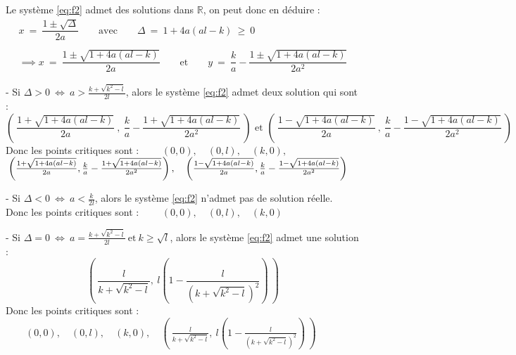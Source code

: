 \documentclass{article}
\begin{document}
Le système \eqref{eq:f2} admet des solutions dans $\mathbb{R}$, on peut donc en déduire :
\begin{equation*}
\begin{array}{cc}
    x\ =\ \dfrac{1 \pm \sqrt{\Delta}}{2a} \qquad \text{avec} \qquad \Delta\ =\ 1 + 4a(al -k)\ \geqslant\ 0\\\\
    \implies
    x\ =\ \dfrac{1 \pm \sqrt{1 + 4a(al - k)}}{2a}
    \qquad \text{et} \qquad
    y\ =\ \dfrac{k}{a} - \dfrac{1 \pm \sqrt{1 + 4a(al -k)}}{2a^2}
\end{array}
\end{equation*}

- Si $\Delta > 0\ \Leftrightarrow\ a > \frac{k + \sqrt{k^2 - l} }{2l}$, alors le système \eqref{eq:f2} admet deux solution qui sont : 
\begin{equation*}
    \left(\ \dfrac{1 + \sqrt{1 + 4a(al -k)}}{2a}\ ,\ \dfrac{k}{a} - \dfrac{1 + \sqrt{1 + 4a(al -k)}}{2a^2}\ \right)
    \text{ et }
    \left(\ \dfrac{1 - \sqrt{1 + 4a(al -k)}}{2a}\ ,\ \dfrac{k}{a} - \dfrac{1 - \sqrt{1 + 4a(al -k)}}{2a^2}\ \right)
\end{equation*}
\qquad Donc les points critiques sont : $\qquad (0,0),\quad (0,l),\quad (k,0),$\\
$\phantom{} \hfill \left(\frac{1 + \sqrt{1 + 4a(al -k)}}{2a}, \frac{k}{a} - \frac{1 + \sqrt{1 + 4a(al -k)}}{2a^2} \right),
\quad \left(\frac{1 - \sqrt{1 + 4a(al -k)}}{2a}, \frac{k}{a} - \frac{1 - \sqrt{1 + 4a(al -k)}}{2a^2}\right) \hfill$

\vfill
- Si $\Delta < 0\ \Leftrightarrow\ a < \frac{k}{2l}$, alors le système \eqref{eq:f2} n'admet pas de solution réelle.\\
\phantom{\qquad} Donc les points critiques sont : $\qquad (0,0),\quad (0,l),\quad (k,0)$

\vfill
- Si $\Delta = 0\ \Leftrightarrow\ a = \frac{k + \sqrt{k^2 - l} }{2l}\ \text{et}\ k \geqslant \sqrt{l}$, alors le système \eqref{eq:f2} admet une solution : 
\begin{equation*}
    \left(\ \dfrac{l}{k + \sqrt{k^2 - l}},\ l\left(1 - \dfrac{l}{(k + \sqrt{k^2 - l})^2} \right)\ \right)
\end{equation*}
\qquad Donc les points critiques sont : $\qquad (0,0),\quad (0,l),\quad (k,0),
\quad \left(\ \frac{l}{k + \sqrt{k^2 - l}},\ l\left(1 - \frac{l}{(k + \sqrt{k^2 - l})^2} \right)\ \right)$

\newpage
\end{document}
